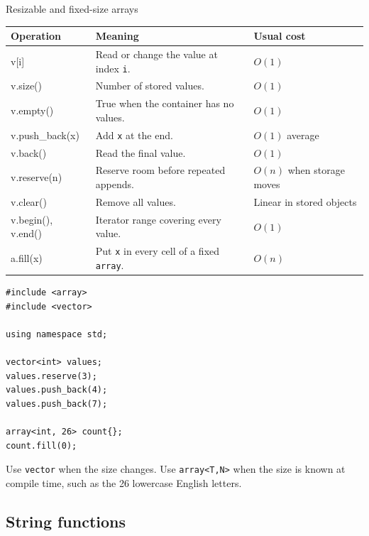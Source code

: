 \begin{revisionbox}{Resizable and fixed-size arrays}
\small
\setlength{\tabcolsep}{3pt}
\begin{tabularx}{\linewidth}{@{}>{\ttfamily}p{3.1cm}X>{\raggedright\arraybackslash}p{2.2cm}@{}}
\toprule
Operation & Meaning & Usual cost \\
\midrule
v[i] & Read or change the value at index \texttt{i}. & $O(1)$ \\
v.size() & Number of stored values. & $O(1)$ \\
v.empty() & True when the container has no values. & $O(1)$ \\
v.push\_back(x) & Add \texttt{x} at the end. & $O(1)$ average \\
v.back() & Read the final value. & $O(1)$ \\
v.reserve(n) & Reserve room before repeated appends. & $O(n)$ when storage moves \\
v.clear() & Remove all values. & Linear in stored objects \\
v.begin(), v.end() & Iterator range covering every value. & $O(1)$ \\
a.fill(x) & Put \texttt{x} in every cell of a fixed \texttt{array}. & $O(n)$ \\
\bottomrule
\end{tabularx}
\end{revisionbox}

\begin{lstlisting}
#include <array>
#include <vector>

using namespace std;

vector<int> values;
values.reserve(3);
values.push_back(4);
values.push_back(7);

array<int, 26> count{};
count.fill(0);
\end{lstlisting}

Use \texttt{vector} when the size changes. Use \texttt{array<T,N>} when the
size is known at compile time, such as the 26 lowercase English letters.

\subsection{String functions}

